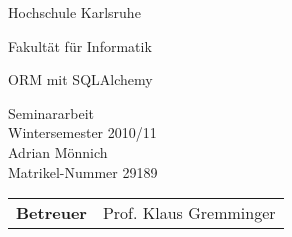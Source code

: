 \documentclass[fontsize=12pt,a4paper,headinclude,oneside,halfparskip,pdftex,pointlessnumbers,plainheadsepline]{scrreprt} %
\begin{document}
\pagestyle{empty}

\clearscrheadings\clearscrplain


\begin{center}
\begin{Huge}
Hochschule Karlsruhe\\
\vspace{3mm}
\end{Huge}{\Large Fakultät für Informatik}\\

\vspace{20mm}
\begin{Large}
ORM mit SQLAlchemy\\
\end{Large}
\vspace{8mm}
Seminararbeit\\
Wintersemester 2010/11\\
\vspace{0.4cm}
\vspace{2 cm}
Adrian Mönnich \\
Matrikel-Nummer 29189\\
\vspace{8cm}
\begin{tabular}{ll}
{\bf Betreuer} & Prof. Klaus Gremminger\\
\end{tabular}

\end{center}
\clearpage





\pagestyle{scrheadings}
\clearscrheadings\clearscrplain
{}
\setheadsepline{.4pt}
\ihead[\headmark]{\headmark}
\ohead[\pagemark]{\pagemark}

\tableofcontents

\end{document}
